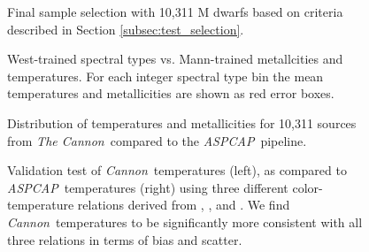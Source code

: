 \documentclass[modern]{aastex62}
\newcommand{\thecannon}{\textsl{The Cannon}}
\newcommand{\cannon}{\textsl{Cannon}}
\newcommand{\aspcap}{\textsl{ASPCAP}}
\begin{document}
\begin{figure}[ht]
\caption{Final sample selection with 10,311 M dwarfs based on criteria described in Section \ref{subsec:test_selection}. \label{fig:safe_selection}}
\end{figure}

\begin{figure}[ht]
\caption{West-trained spectral types vs. Mann-trained metallcities and temperatures. For each integer spectral type bin the mean temperatures and metallicities are shown as red error boxes. \label{fig:west_vs_mann}}
\end{figure}

\begin{figure}[ht]
\caption{Distribution of temperatures and metallicities for 10,311 sources from \thecannon\ compared to the \aspcap\ pipeline. \label{fig:aspcap_cannon_label_hist}}
\end{figure}

\begin{figure}[ht]
\caption{Validation test of \cannon\ temperatures (left), as compared to \aspcap\ temperatures (right) using three different color-temperature relations derived from \citealt{Mann:2015}, \citealt{Casagrande:2008}, and \citealt{Boyajian:2013}. We find \cannon\ temperatures to be significantly more consistent with all three relations in terms of bias and scatter. \label{fig:aspcap_cannon_validation}}
\end{figure}



\end{document}
